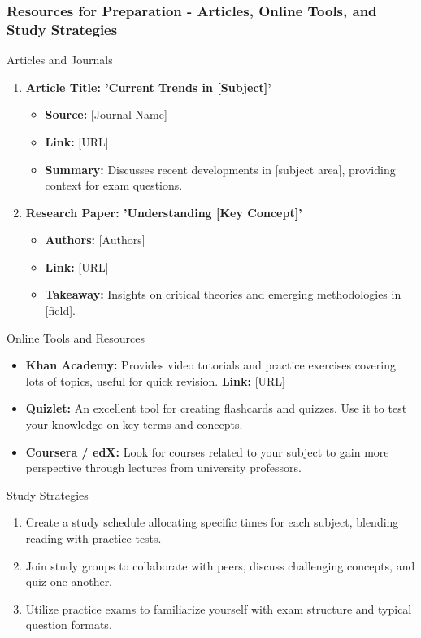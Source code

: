 \documentclass{beamer}
\begin{document}
\begin{frame}[fragile]
    \frametitle{Resources for Preparation - Articles, Online Tools, and Study Strategies}
    \begin{block}{Articles and Journals}
        \begin{enumerate}
            \item \textbf{Article Title: 'Current Trends in [Subject]'}
            \begin{itemize}
                \item \textbf{Source:} [Journal Name]
                \item \textbf{Link:} [URL]
                \item \textbf{Summary:} Discusses recent developments in [subject area], providing context for exam questions.
            \end{itemize}

            \item \textbf{Research Paper: 'Understanding [Key Concept]'}
            \begin{itemize}
                \item \textbf{Authors:} [Authors]
                \item \textbf{Link:} [URL]
                \item \textbf{Takeaway:} Insights on critical theories and emerging methodologies in [field].
            \end{itemize}
        \end{enumerate}
    \end{block}

    \begin{block}{Online Tools and Resources}
        \begin{itemize}
            \item \textbf{Khan Academy:} Provides video tutorials and practice exercises covering lots of topics, useful for quick revision. \textbf{Link:} [URL]
            \item \textbf{Quizlet:} An excellent tool for creating flashcards and quizzes. Use it to test your knowledge on key terms and concepts.
            \item \textbf{Coursera / edX:} Look for courses related to your subject to gain more perspective through lectures from university professors.
        \end{itemize}
    \end{block}

    \begin{block}{Study Strategies}
        \begin{enumerate}
            \item Create a study schedule allocating specific times for each subject, blending reading with practice tests.
            \item Join study groups to collaborate with peers, discuss challenging concepts, and quiz one another.
            \item Utilize practice exams to familiarize yourself with exam structure and typical question formats.
        \end{enumerate}
    \end{block}
\end{frame}
\end{document}
